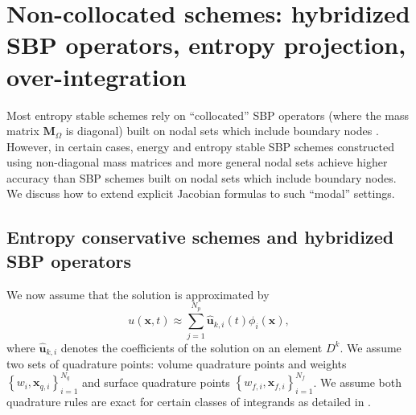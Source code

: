 \documentclass{article}
\renewcommand{\hat}{\widehat}
\newcommand{\LRc}[1]{\left\{ #1 \right\}}
\begin{document}



\section{Non-collocated schemes: hybridized SBP operators, entropy projection, over-integration}

Most entropy stable schemes rely on ``collocated'' SBP operators (where the mass matrix $\bm{M}_{\Omega}$ is diagonal) built on nodal sets which include boundary nodes \cite{chen2017entropy, crean2018entropy}.  However, in certain cases, energy and entropy stable SBP schemes constructed using non-diagonal mass matrices \cite{chan2017discretely, chan2019entropy} and more general nodal sets \cite{fernandez2014review, ranocha2018generalised, crean2017high, chan2018efficient} achieve higher accuracy than SBP schemes built on nodal sets which include boundary nodes.  We discuss how to extend explicit Jacobian formulas to such ``modal'' settings.  

\subsection{Entropy conservative schemes and hybridized SBP operators}

We now assume that the solution is approximated by 
\[
u(\bm{x},t) \approx \sum_{j=1}^{N_p} \hat{\bm{u}}_{k,i}(t) \phi_i(\bm{x}),
\]
where $\hat{\bm{u}}_{k,i}$ denotes the coefficients of the solution on an element $D^k$.  We assume two sets of quadrature points: volume quadrature points and weights $\LRc{w_i, \bm{x}_{q,i}}_{i=1}^{N_q}$ and surface quadrature points $\LRc{w_{f,i}, \bm{x}_{f,i}}_{i=1}^{N_f}$.  We assume both quadrature rules are exact for certain classes of integrands as detailed in \cite{chan2019skew, chan2019entropy}.  
\end{document}
